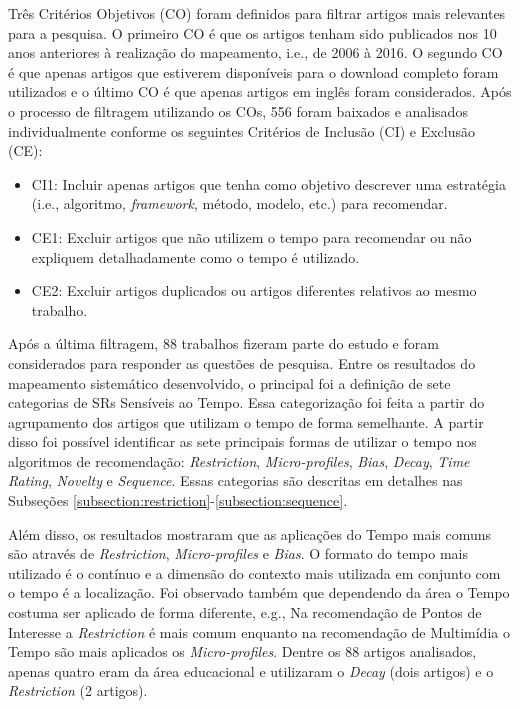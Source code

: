 Três Critérios Objetivos (CO) foram definidos para filtrar artigos mais relevantes para a pesquisa. O primeiro CO é que os
artigos tenham sido publicados nos 10 anos anteriores à realização do mapeamento, i.e., de 2006 à 2016. O segundo CO é
que apenas artigos que estiverem disponíveis para o download completo foram utilizados e o último CO é que apenas artigos
em inglês foram considerados. Após o processo de filtragem utilizando os COs, 556 foram baixados e analisados individualmente
conforme os seguintes Critérios de Inclusão (CI) e Exclusão (CE):

\begin{itemize}
\item CI1: Incluir apenas artigos que tenha como objetivo descrever uma estratégia (i.e., algoritmo, \textit{framework},
método, modelo, etc.) para recomendar.
\item CE1: Excluir artigos que não utilizem o tempo para recomendar ou não expliquem detalhadamente como o tempo é utilizado.
\item CE2: Excluir artigos duplicados ou artigos diferentes relativos ao mesmo trabalho.
\end{itemize}

Após a última filtragem, 88 trabalhos fizeram parte do estudo e foram considerados para responder as
questões de pesquisa. Entre os resultados do mapeamento sistemático desenvolvido, o principal
foi a definição de sete categorias de SRs Sensíveis ao Tempo. Essa categorização foi feita a partir do agrupamento
dos artigos que utilizam o tempo de forma semelhante. A partir disso foi possível identificar as sete principais
formas de utilizar o tempo nos algoritmos de recomendação: \textit{Restriction}, \textit{Micro-profiles}, \textit{Bias},
\textit{Decay}, \textit{Time Rating}, \textit{Novelty} e \textit{Sequence}. Essas categorias são descritas em detalhes
nas Subseções \ref{subsection:restriction}-\ref{subsection:sequence}.

Além disso, os resultados mostraram que as aplicações do Tempo mais comuns são através de \textit{Restriction},
\textit{Micro-profiles} e \textit{Bias}. O formato do tempo mais utilizado é o contínuo e a dimensão do contexto mais
utilizada em conjunto com o tempo é a localização. Foi observado também que dependendo da área o Tempo costuma ser
aplicado de forma diferente, e.g., Na recomendação de Pontos de Interesse a \textit{Restriction} é mais comum enquanto na recomendação de Multimídia o Tempo são mais aplicados os
\textit{Micro-profiles}. Dentre os 88 artigos analisados, apenas quatro eram da área educacional e utilizaram o
\textit{Decay} (dois artigos) e o \textit{Restriction} (2 artigos).

